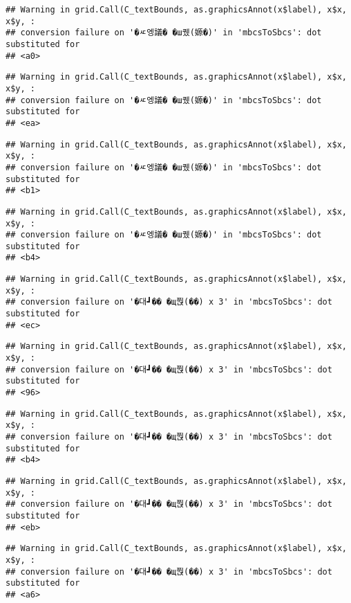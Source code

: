 \documentclass[
]{article}
\begin{document}
\begin{verbatim}
## Warning in grid.Call(C_textBounds, as.graphicsAnnot(x$label), x$x, x$y, :
## conversion failure on '�ㅼ엥議� �ш퀬(嫄�)' in 'mbcsToSbcs': dot substituted for
## <a0>
\end{verbatim}

\begin{verbatim}
## Warning in grid.Call(C_textBounds, as.graphicsAnnot(x$label), x$x, x$y, :
## conversion failure on '�ㅼ엥議� �ш퀬(嫄�)' in 'mbcsToSbcs': dot substituted for
## <ea>
\end{verbatim}

\begin{verbatim}
## Warning in grid.Call(C_textBounds, as.graphicsAnnot(x$label), x$x, x$y, :
## conversion failure on '�ㅼ엥議� �ш퀬(嫄�)' in 'mbcsToSbcs': dot substituted for
## <b1>
\end{verbatim}

\begin{verbatim}
## Warning in grid.Call(C_textBounds, as.graphicsAnnot(x$label), x$x, x$y, :
## conversion failure on '�ㅼ엥議� �ш퀬(嫄�)' in 'mbcsToSbcs': dot substituted for
## <b4>
\end{verbatim}

\begin{verbatim}
## Warning in grid.Call(C_textBounds, as.graphicsAnnot(x$label), x$x, x$y, :
## conversion failure on '�대┛�� �щ쭩(��) x 3' in 'mbcsToSbcs': dot substituted for
## <ec>
\end{verbatim}

\begin{verbatim}
## Warning in grid.Call(C_textBounds, as.graphicsAnnot(x$label), x$x, x$y, :
## conversion failure on '�대┛�� �щ쭩(��) x 3' in 'mbcsToSbcs': dot substituted for
## <96>
\end{verbatim}

\begin{verbatim}
## Warning in grid.Call(C_textBounds, as.graphicsAnnot(x$label), x$x, x$y, :
## conversion failure on '�대┛�� �щ쭩(��) x 3' in 'mbcsToSbcs': dot substituted for
## <b4>
\end{verbatim}

\begin{verbatim}
## Warning in grid.Call(C_textBounds, as.graphicsAnnot(x$label), x$x, x$y, :
## conversion failure on '�대┛�� �щ쭩(��) x 3' in 'mbcsToSbcs': dot substituted for
## <eb>
\end{verbatim}

\begin{verbatim}
## Warning in grid.Call(C_textBounds, as.graphicsAnnot(x$label), x$x, x$y, :
## conversion failure on '�대┛�� �щ쭩(��) x 3' in 'mbcsToSbcs': dot substituted for
## <a6>
\end{verbatim}
\end{document}
